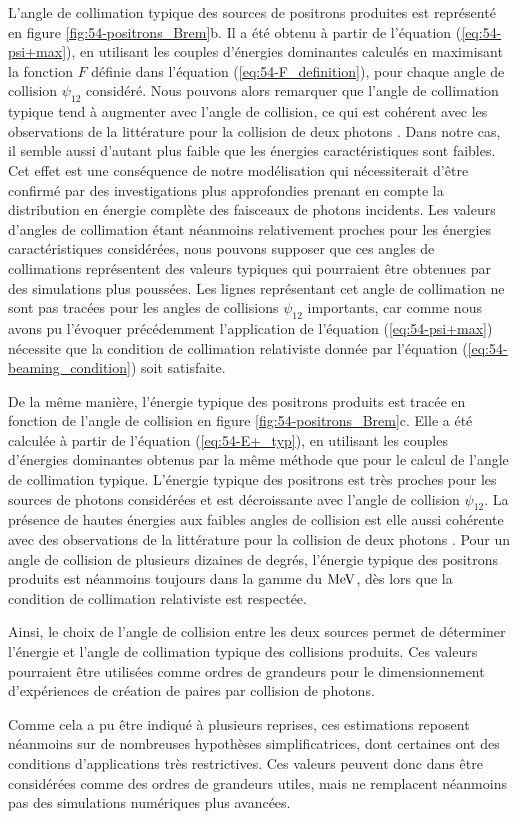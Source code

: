 \begin{refsection}
L'angle de collimation typique des sources de positrons produites est représenté en figure \ref{fig:54-positrons_Brem}b. Il a été obtenu à partir de l'équation (\ref{eq:54-psi+max}), en utilisant les couples d'énergies dominantes calculés en maximisant la fonction $F$ définie dans l'équation (\ref{eq:54-F_definition}), pour chaque angle de collision $\psi_{12}$ considéré. Nous pouvons alors remarquer que l'angle de collimation typique tend à augmenter avec l'angle de collision, ce qui est cohérent avec les observations de la littérature pour la collision de deux photons \parencite{ribeyre_2017}. Dans notre cas, il semble aussi d'autant plus faible que les énergies caractéristiques sont faibles. Cet effet est une conséquence de notre modélisation qui nécessiterait d'être confirmé par des investigations plus approfondies prenant en compte la distribution en énergie complète des faisceaux de photons incidents. Les valeurs d'angles de collimation étant néanmoins relativement proches pour les énergies caractéristiques considérées, nous pouvons supposer que ces angles de collimations représentent des valeurs typiques qui pourraient être obtenues par des simulations plus poussées. Les lignes représentant cet angle de collimation ne sont pas tracées pour les angles de collisions $\psi_{12}$ importants, car comme nous avons pu l'évoquer précédemment l'application de l'équation (\ref{eq:54-psi+max}) nécessite que la condition de collimation relativiste donnée par l'équation (\ref{eq:54-beaming_condition}) soit satisfaite. 

De la même manière, l'énergie typique des positrons produits est tracée en fonction de l'angle de collision en figure \ref{fig:54-positrons_Brem}c. Elle a été calculée à partir de l'équation (\ref{eq:54-E+_typ}), en utilisant les couples d'énergies dominantes obtenus par la même méthode que pour le calcul de l'angle de collimation typique. L'énergie typique des positrons est très proches pour les sources de photons considérées et est décroissante avec l'angle de collision $\psi_{12}$. La présence de hautes énergies aux faibles angles de collision est elle aussi cohérente avec des observations de la littérature pour la collision de deux photons \parencite{ribeyre_2017}. Pour un angle de collision de plusieurs dizaines de degrés, l'énergie typique des positrons produits est néanmoins toujours dans la gamme du $\rm MeV$, dès lors que la condition de collimation relativiste est respectée. 

Ainsi, le choix de l'angle de collision entre les deux sources permet de déterminer l'énergie et l'angle de collimation typique des collisions produits. Ces valeurs pourraient être utilisées comme ordres de grandeurs pour le dimensionnement d'expériences de création de paires par collision de photons.

Comme cela a pu être indiqué à plusieurs reprises, ces estimations reposent néanmoins sur de nombreuses hypothèses simplificatrices, dont certaines ont des conditions d'applications très restrictives. Ces valeurs peuvent donc dans être considérées comme des ordres de grandeurs utiles, mais ne remplacent néanmoins pas des simulations numériques plus avancées. 

\newpage
\printbibliography[heading=subbibintoc]
\end{refsection}